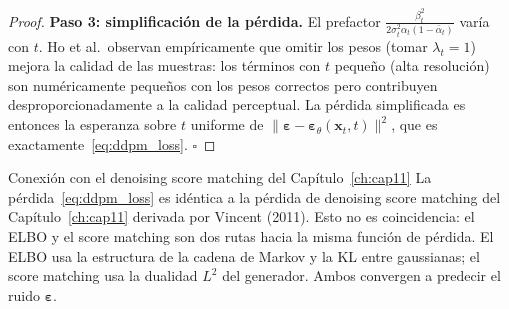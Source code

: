 \begin{proof}
\textbf{Paso 3: simplificación de la pérdida.}
El prefactor $\frac{\beta_t^2}{2\sigma_t^2\alpha_t(1-\bar{\alpha}_t)}$ varía con
$t$. Ho et al.\ observan empíricamente que omitir los pesos (tomar $\lambda_t = 1$)
mejora la calidad de las muestras: los términos con $t$ pequeño (alta resolución)
son numéricamente pequeños con los pesos correctos pero contribuyen
desproporcionadamente a la calidad perceptual. La pérdida simplificada es
entonces la esperanza sobre $t$ uniforme de $\|\bm{\varepsilon} -
\bm{\varepsilon}_\theta(\bm{x}_t,t)\|^2$, que es exactamente~\eqref{eq:ddpm_loss}.
$\square$
\end{proof}

\begin{observacion}{Conexión con el denoising score matching del Capítulo~\ref{ch:cap11}}
La pérdida~\eqref{eq:ddpm_loss} es idéntica a la pérdida de denoising score matching
del Capítulo~\ref{ch:cap11} derivada por Vincent (2011).
Esto no es coincidencia: el ELBO y el score matching son dos rutas hacia la
misma función de pérdida. El ELBO usa la estructura de la cadena de Markov y la
KL entre gaussianas; el score matching usa la dualidad $L^2$ del generador.
Ambos convergen a predecir el ruido $\bm{\varepsilon}$.
\end{observacion}

